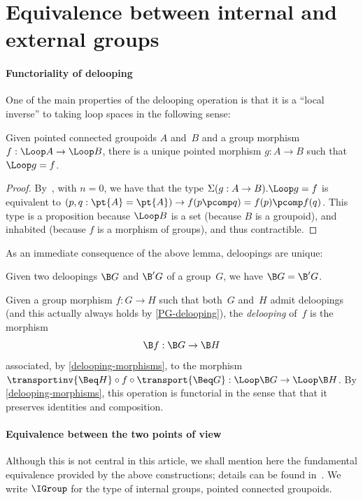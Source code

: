 \section{Equivalence between internal and external groups}
\paragraph{Functoriality of delooping}
\label{delooping-functorial}
One of the main properties of the delooping operation is that it is a ``local
inverse'' to taking loop spaces in the following sense:

\begin{proposition}
  \label{delooping-morphisms}
  Given pointed connected groupoids $A$ and~$B$ and a group morphism
  $f:\Loop A\to\Loop B$, there is a unique pointed morphism $g:A\to B$ such
  that $\Loop g=f$.
\end{proposition}
\begin{proof}
  By~\cite[Corollary~12]{warn2023eilenberg}, with $n=0$, we have that the type
  $\Sigma(g:A\to B).\Loop g=f$ is equivalent to
  $(p,q:\pt{A}=\pt{A})\to f(p\pcomp q)=f(p)\pcomp f(q)$. This type is a
  proposition because $\Loop B$ is a set (because $B$ is a groupoid), and
  inhabited (because $f$ is a morphism of groups), and thus contractible.
\end{proof}

\noindent
As an immediate consequence of the above lemma, deloopings are unique:

\begin{proposition}
  \label{delooping-unique}
  Given two deloopings $\B G$ and $\B' G$ of a group~$G$, we have $\B G=\B' G$.
\end{proposition}

\noindent
Given a group morphism $f:G\to H$ such that both~$G$ and~$H$ admit deloopings
(and this actually always holds by \cref{PG-delooping}), the \emph{delooping} of~$f$ is the morphism
\[
  \B f:\B G\to\B H
\]
associated, by \cref{delooping-morphisms}, to the morphism
$\transportinv{\Beq H}\circ f\circ\transport{\Beq G}:\Loop\B G\to\Loop\B
H$. By \cref{delooping-morphisms}, this operation is functorial in the sense
that that it preserves identities and composition.

\paragraph{Equivalence between the two points of view}
Although this is not central in this article, we shall mention here the
fundamental equivalence provided by the above constructions; details can be
found in~\cite{symmetry}.
%
We write $\IGroup$ for the type of internal groups, \ie pointed connected
groupoids.


